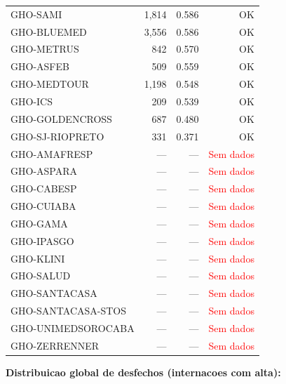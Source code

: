 \documentclass[11pt,a4paper]{article}
\begin{document}
\begin{center}
\begin{tabular}{lrrr}
\rowcolor{red!20}GHO-SAMI & 1,814 & 0.586 & OK \\
\rowcolor{red!20}GHO-BLUEMED & 3,556 & 0.586 & OK \\
\rowcolor{red!20}GHO-METRUS & 842 & 0.570 & OK \\
\rowcolor{red!20}GHO-ASFEB & 509 & 0.559 & OK \\
\rowcolor{red!20}GHO-MEDTOUR & 1,198 & 0.548 & OK \\
\rowcolor{red!20}GHO-ICS & 209 & 0.539 & OK \\
\rowcolor{red!20}GHO-GOLDENCROSS & 687 & 0.480 & OK \\
\rowcolor{red!20}GHO-SJ-RIOPRETO & 331 & 0.371 & OK \\
GHO-AMAFRESP & --- & --- & \textcolor{red}{Sem dados} \\
GHO-ASPARA & --- & --- & \textcolor{red}{Sem dados} \\
GHO-CABESP & --- & --- & \textcolor{red}{Sem dados} \\
GHO-CUIABA & --- & --- & \textcolor{red}{Sem dados} \\
GHO-GAMA & --- & --- & \textcolor{red}{Sem dados} \\
GHO-IPASGO & --- & --- & \textcolor{red}{Sem dados} \\
GHO-KLINI & --- & --- & \textcolor{red}{Sem dados} \\
GHO-SALUD & --- & --- & \textcolor{red}{Sem dados} \\
GHO-SANTACASA & --- & --- & \textcolor{red}{Sem dados} \\
GHO-SANTACASA-STOS & --- & --- & \textcolor{red}{Sem dados} \\
GHO-UNIMEDSOROCABA & --- & --- & \textcolor{red}{Sem dados} \\
GHO-ZERRENNER & --- & --- & \textcolor{red}{Sem dados} \\
\bottomrule
\end{tabular}
\end{center}

\vspace{4pt}\noindent\textbf{Distribuicao global de desfechos (internacoes com alta):}
\end{document}
